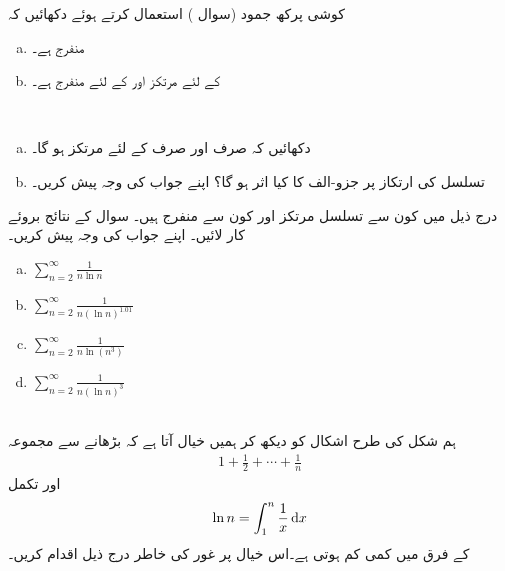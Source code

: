 کوشی پرکھ جمود (سوال ) استعمال کرتے ہوئے دکھائیں کہ
\begin{enumerate}[a.]
\item
{} منفرج ہے۔
\item
{} کے لئے  مرتکز اور  کے لئے منفرج ہے۔
\end{enumerate}
\\
\begin{enumerate}[a.]
\item
دکھائیں کہ صرف اور صرف  کے لئے   مرتکز ہو گا۔
\item
تسلسل  کی ارتکاز پر جزو-الف کا کیا اثر ہو گا؟ اپنے جواب کی وجہ پیش کریں۔
\end{enumerate}
درج ذیل میں کون سے تسلسل مرتکز اور کون سے منفرج ہیں۔ سوال  کے نتائج بروئے کار لائیں۔ اپنے جواب کی وجہ پیش کریں۔
\begin{multicols}{4}
\begin{enumerate}[a.]
\item
$\sum\limits_{n=2}^{\infty}\frac{1}{n\ln n}$
\item
$\sum\limits_{n=2}^{\infty}\frac{1}{n(\ln n)^{1.01}}$
\item
$\sum\limits_{n=2}^{\infty}\frac{1}{n\ln (n^3)}$
\item
$\sum\limits_{n=2}^{\infty}\frac{1}{n(\ln n)^3}$
\end{enumerate}
\end{multicols}
\\
ہم شکل  کی طرح اشکال کو دیکھ کر ہمیں خیال آتا ہے کہ  بڑھانے سے  مجموعہ
\begin{align*}
1+\frac{1}{2}+\cdots+\frac{1}{n}
\end{align*}
 اور تکمل
\begin{align*}
\ln n=\int_1^n\frac{1}{x}\dif x
\end{align*}
کے فرق میں کمی کم ہوتی ہے۔اس خیال پر غور کی خاطر درج ذیل اقدام کریں۔
